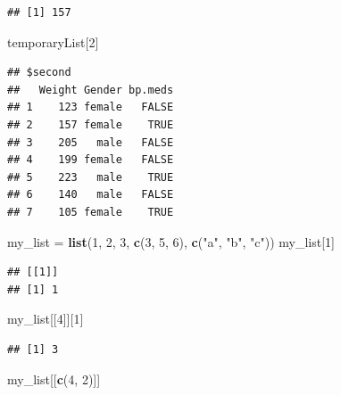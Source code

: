 \documentclass[]{article}
\newenvironment{Shaded}{\begin{snugshade}}{\end{snugshade}}
\newcommand{\KeywordTok}[1]{\textcolor[rgb]{0.13,0.29,0.53}{\textbf{#1}}}
\newcommand{\DecValTok}[1]{\textcolor[rgb]{0.00,0.00,0.81}{#1}}
\newcommand{\StringTok}[1]{\textcolor[rgb]{0.31,0.60,0.02}{#1}}
\newcommand{\NormalTok}[1]{#1}
\begin{document}
\begin{verbatim}
## [1] 157
\end{verbatim}

\begin{Shaded}
\begin{Highlighting}[]
\NormalTok{temporaryList[}\DecValTok{2}\NormalTok{]}
\end{Highlighting}
\end{Shaded}

\begin{verbatim}
## $second
##   Weight Gender bp.meds
## 1    123 female   FALSE
## 2    157 female    TRUE
## 3    205   male   FALSE
## 4    199 female   FALSE
## 5    223   male    TRUE
## 6    140   male   FALSE
## 7    105 female    TRUE
\end{verbatim}

\begin{Shaded}
\begin{Highlighting}[]
\NormalTok{my_list =}\StringTok{ }\KeywordTok{list}\NormalTok{(}\DecValTok{1}\NormalTok{, }\DecValTok{2}\NormalTok{, }\DecValTok{3}\NormalTok{, }\KeywordTok{c}\NormalTok{(}\DecValTok{3}\NormalTok{, }\DecValTok{5}\NormalTok{, }\DecValTok{6}\NormalTok{), }\KeywordTok{c}\NormalTok{(}\StringTok{"a"}\NormalTok{, }\StringTok{"b"}\NormalTok{, }\StringTok{"c"}\NormalTok{))}
\NormalTok{my_list[}\DecValTok{1}\NormalTok{]}
\end{Highlighting}
\end{Shaded}

\begin{verbatim}
## [[1]]
## [1] 1
\end{verbatim}

\begin{Shaded}
\begin{Highlighting}[]
\NormalTok{my_list[[}\DecValTok{4}\NormalTok{]][}\DecValTok{1}\NormalTok{]}
\end{Highlighting}
\end{Shaded}

\begin{verbatim}
## [1] 3
\end{verbatim}

\begin{Shaded}
\begin{Highlighting}[]
\NormalTok{my_list[[}\KeywordTok{c}\NormalTok{(}\DecValTok{4}\NormalTok{, }\DecValTok{2}\NormalTok{)]]}
\end{Highlighting}
\end{Shaded}
\end{document}
